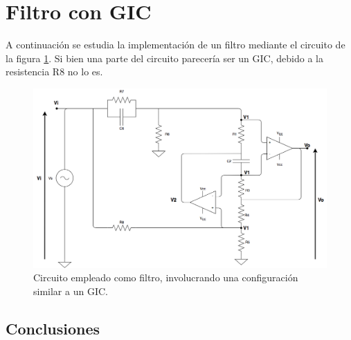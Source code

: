 
\section{Filtro con GIC}

A continuaci\'on se estudia la implementaci\'on de un filtro mediante el circuito de la figura \ref{circ1}. Si bien una parte del circuito parecer\'ia ser un GIC, debido a la resistencia R8 no lo es.

\begin{figure}[H] %
	\centering
	\includegraphics[scale=0.4]{../EJ1/circuito1.png}
	\caption{Circuito empleado como filtro, involucrando una configuraci\'on similar a un GIC.}
	\label{circ1}
\end{figure}














\subsection{Conclusiones}

